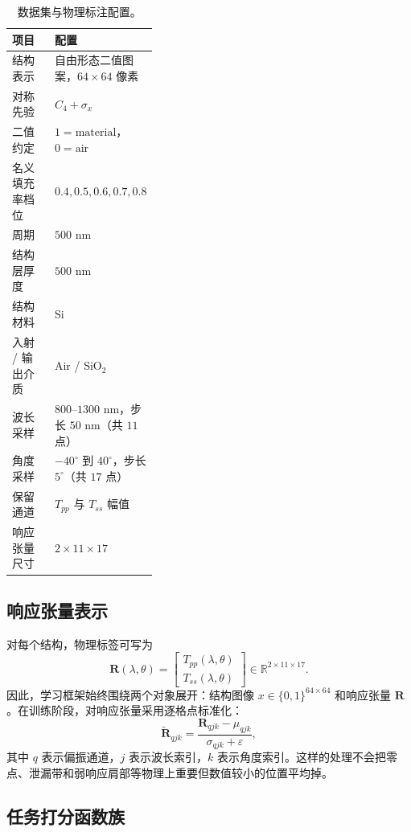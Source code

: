 \documentclass[10pt,a4paper]{article}
\newcommand{\tp}{T_{pp}}
\newcommand{\ts}{T_{ss}}
\newcommand{\lam}{\lambda}
\newcommand{\ang}{\theta}
\begin{document}
\begin{table}[!htbp]
\centering
\caption{数据集与物理标注配置。}
\begin{tabularx}{\linewidth}{>{\raggedright\arraybackslash}p{0.36\linewidth}X}
\toprule
项目 & 配置 \\
\midrule
结构表示 & 自由形态二值图案，$64\times64$ 像素 \\
对称先验 & $C_4+\sigma_x$ \\
二值约定 & $1=\mathrm{material}$，$0=\mathrm{air}$ \\
名义填充率档位 & $0.4, 0.5, 0.6, 0.7, 0.8$ \\
周期 & $500$ nm \\
结构层厚度 & $500$ nm \\
结构材料 & Si \\
入射 / 输出介质 & Air / SiO$_2$ \\
波长采样 & $800$--$1300$ nm，步长 $50$ nm（共 $11$ 点） \\
角度采样 & $-40^\circ$ 到 $40^\circ$，步长 $5^\circ$（共 $17$ 点） \\
保留通道 & $\tp$ 与 $\ts$ 幅值 \\
响应张量尺寸 & $2\times11\times17$ \\
\bottomrule
\end{tabularx}
\end{table}

\subsection{响应张量表示}

对每个结构，物理标签可写为
\begin{equation}
\mathbf{R}(\lam,\ang)=
\begin{bmatrix}
\tp(\lam,\ang)\\
\ts(\lam,\ang)
\end{bmatrix}
\in \mathbb{R}^{2\times 11\times 17}.
\end{equation}
因此，学习框架始终围绕两个对象展开：结构图像 $x\in\{0,1\}^{64\times64}$ 和响应张量 $\mathbf{R}$。在训练阶段，对响应张量采用逐格点标准化：
\begin{equation}
\widetilde{\mathbf{R}}_{qjk}=\frac{\mathbf{R}_{qjk}-\mu_{qjk}}{\sigma_{qjk}+\varepsilon},
\end{equation}
其中 $q$ 表示偏振通道，$j$ 表示波长索引，$k$ 表示角度索引。这样的处理不会把零点、泄漏带和弱响应肩部等物理上重要但数值较小的位置平均掉。

\subsection{任务打分函数族}
\end{document}
